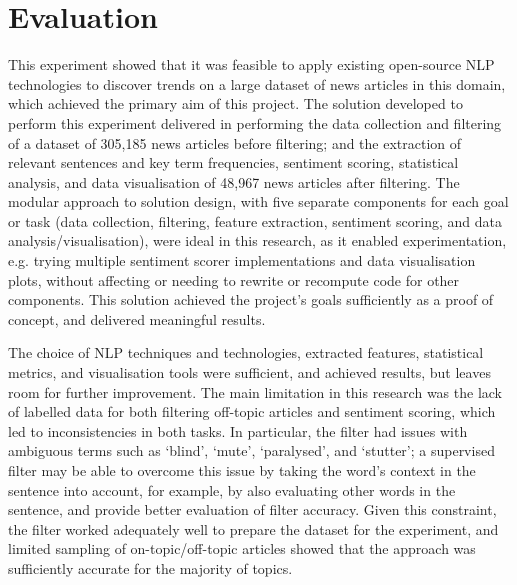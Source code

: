 \documentclass{report}
\begin{document}
\section{Evaluation} \label{Evaluation}

This experiment showed that it was feasible to apply existing open-source NLP technologies to discover trends on a large dataset of news articles in this domain, which achieved the primary aim of this project.
The solution developed to perform this experiment delivered in performing the data collection and filtering of a dataset of 305,185 news articles before filtering; 
and the extraction of relevant sentences and key term frequencies, sentiment scoring, statistical analysis, and data visualisation of 48,967 news articles after filtering.
The modular approach to solution design, with five separate components for each goal or task (data collection, filtering, feature extraction, sentiment scoring, and data analysis/visualisation), were ideal in this research, as it enabled experimentation, e.g. trying multiple sentiment scorer implementations and data visualisation plots, without affecting or needing to rewrite or recompute code for other components.
This solution achieved the project's goals sufficiently as a proof of concept, and delivered meaningful results.

The choice of NLP techniques and technologies, extracted features, statistical metrics, and visualisation tools were sufficient, and achieved results, but leaves room for further improvement.
The main limitation in this research was the lack of labelled data for both filtering off-topic articles and sentiment scoring, which led to inconsistencies in both tasks.
In particular, the filter had issues with ambiguous terms such as `blind', `mute', `paralysed', and `stutter'; a supervised filter may be able to overcome this issue by taking the word's context in the sentence into account, for example, by also evaluating other words in the sentence, and provide better evaluation of filter accuracy. 
Given this constraint, the filter worked adequately well to prepare the dataset for the experiment, and limited sampling of on-topic/off-topic articles showed that the approach was sufficiently accurate for the majority of topics.
\end{document}
